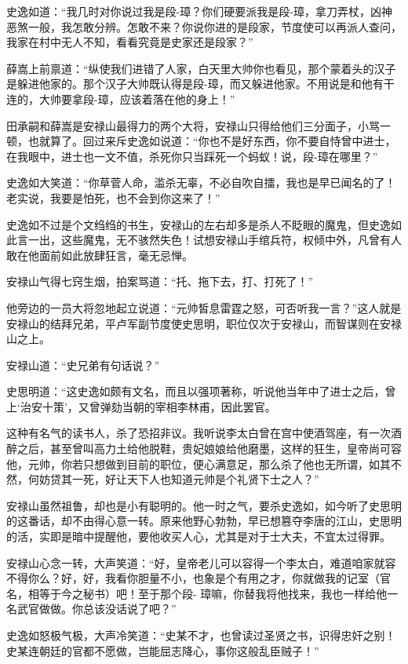 \documentclass[12pt,oneside]{book}
\begin{document}
史逸如道：``我几时对你说过我是段-璋？你们硬要派我是段-璋，拿刀弄杖，凶神恶煞一般，我怎敢分辨。怎敢不来？你说你进的是段家，节度使可以再派人查问，我家在村中无人不知，看看究竟是史家还是段家？''

薛嵩上前禀道：``纵使我们进错了人家，白天里大帅你也看见，那个蒙着头的汉子是躲进他家的。那个汉子大帅既认得是段-璋，而又躲进他家。不用说是和他有干连的，大帅要拿段-璋，应该着落在他的身上！''

田承嗣和薛嵩是安禄山最得力的两个大将，安禄山只得给他们三分面子，小骂一顿，也就算了。回过来斥史逸如说道：``你也不是好东西，你不要自恃曾中进士，在我眼中，进士也一文不值，杀死你只当踩死一个蚂蚁！说，段-璋在哪里？''

史逸如大笑道：``你草菅人命，滥杀无辜，不必自吹自擂，我也是早已闻名的了！老实说，我要是怕死，也不会到你这来了！''

史逸如不过是个文绉绉的书生，安禄山的左右却多是杀人不眨眼的魔鬼，但史逸如此言一出，这些魔鬼，无不骇然失色！试想安禄山手绾兵符，权倾中外，凡曾有人敢在他面前如此放肆狂言，毫无忌惮。

安禄山气得七窍生烟，拍案骂道：``托、拖下去，打、打死了！''

他旁边的一员大将忽地起立说道：``元帅皙息雷霆之怒，可否听我一言？''这人就是安禄山的结拜兄弟，平卢军副节度使史思明，职位仅次于安禄山，而智谋则在安禄山之上。

安禄山道：``史兄弟有句话说？''

史思明道：``这史逸如颇有文名，而且以强项著称，听说他当年中了进士之后，曾上`治安十策'，又曾弹劾当朝的宰相李林甫，因此罢官。

这种有名气的读书人，杀了恐招非议。我听说李太白曾在宫中使酒驾座，有一次酒醉之后，甚至曾叫高力土给他脱鞋，贵妃娘娘给他磨墨，这样的狂生，皇帝尚可容他，元帅，你若只想做到目前的职位，便心满意足，那么杀了他也无所谓，如其不然，何妨贷其一死，好让天下人也知道元帅是个礼贤下士之人？''

安禄山虽然祖鲁，却也是小有聪明的。他一时之气，要杀史逸如，如今听了史思明的这番话，却不由得心意一转。原来他野心勃勃，早已想篡夺李唐的江山，史思明的活，实即是暗中提醒他，要他收买人心，尤其是对于士大夫，不宜太过得罪。

安禄山心念一转，大声笑道：``好，皇帝老儿可以容得一个李太白，难道咱家就容不得你么？好，好，我看你胆量不小，也象是个有用之才，你就做我的记室（官名，相等于今之秘书）吧！至于那个段-
璋嘛，你替我将他找来，我也一样给他一名武官做做。你总该没话说了吧？''

史逸如怒极气极，大声冷笑道：``史某不才，也曾读过圣贤之书，识得忠奸之别！史某连朝廷的官都不愿做，岂能屈志降心，事你这般乱臣贼子！''
\end{document}
